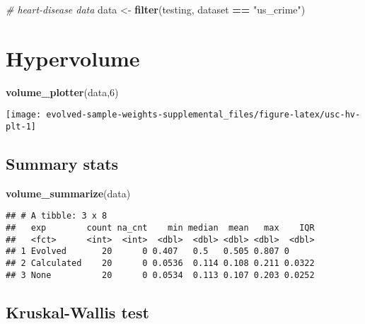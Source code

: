 \documentclass[
]{book}
\newenvironment{Shaded}{\begin{snugshade}}{\end{snugshade}}
\newcommand{\CommentTok}[1]{\textcolor[rgb]{0.56,0.35,0.01}{\textit{#1}}}
\newcommand{\DecValTok}[1]{\textcolor[rgb]{0.00,0.00,0.81}{#1}}
\newcommand{\FunctionTok}[1]{\textcolor[rgb]{0.13,0.29,0.53}{\textbf{#1}}}
\newcommand{\NormalTok}[1]{#1}
\newcommand{\OtherTok}[1]{\textcolor[rgb]{0.56,0.35,0.01}{#1}}
\newcommand{\SpecialCharTok}[1]{\textcolor[rgb]{0.81,0.36,0.00}{\textbf{#1}}}
\newcommand{\StringTok}[1]{\textcolor[rgb]{0.31,0.60,0.02}{#1}}
\begin{document}
\begin{Shaded}
\begin{Highlighting}[]
\CommentTok{\# heart{-}disease data}
\NormalTok{data }\OtherTok{\textless{}{-}} \FunctionTok{filter}\NormalTok{(testing, dataset }\SpecialCharTok{==} \StringTok{"us\_crime"}\NormalTok{)}
\end{Highlighting}
\end{Shaded}

\hypertarget{hypervolume-5}{%
\section{Hypervolume}\label{hypervolume-5}}

\begin{Shaded}
\begin{Highlighting}[]
\FunctionTok{volume\_plotter}\NormalTok{(data,}\DecValTok{6}\NormalTok{)}
\end{Highlighting}
\end{Shaded}

\texttt{[image: evolved-sample-weights-supplemental\_files/figure-latex/usc-hv-plt-1]}

\hypertarget{summary-stats-5}{%
\subsection{Summary stats}\label{summary-stats-5}}

\begin{Shaded}
\begin{Highlighting}[]
\FunctionTok{volume\_summarize}\NormalTok{(data)}
\end{Highlighting}
\end{Shaded}

\begin{verbatim}
## # A tibble: 3 x 8
##   exp        count na_cnt    min median  mean   max    IQR
##   <fct>      <int>  <int>  <dbl>  <dbl> <dbl> <dbl>  <dbl>
## 1 Evolved       20      0 0.407   0.5   0.505 0.807 0     
## 2 Calculated    20      0 0.0536  0.114 0.108 0.211 0.0322
## 3 None          20      0 0.0534  0.113 0.107 0.203 0.0252
\end{verbatim}

\hypertarget{kruskal-wallis-test-5}{%
\subsection{Kruskal-Wallis test}\label{kruskal-wallis-test-5}}
\end{document}
